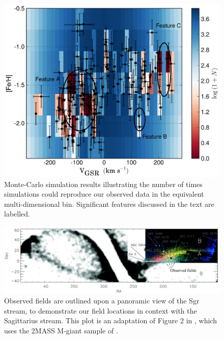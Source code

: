 \documentclass[preprint2]{aastex}
\begin{document}
	\begin{figure}[h!]
		\includegraphics[width=\columnwidth]{./figures/montecarlo.eps}
		\caption{Monte-Carlo simulation results illustrating the number of times simulations could reproduce our observed data in the equivalent multi-dimensional bin. Significant features discussed in the text are labelled.}
		\label{fig:monte-carlo}
	\end{figure}

	\begin{figure}[t!]
		\includegraphics[width=\textwidth]{./figures/belokurov2006.eps}
		\caption{Observed fields are outlined upon a panoramic view of the Sgr stream, to demonstrate our field locations in context with the Sagittarius stream. This plot is an adaptation of Figure 2 in \citet{Belokurov;et-al_2006}, which uses the 2MASS M-giant sample of \citet{Majewski;et-al_2003}.}
		\label{fig:sgr-field-of-streams}
	\end{figure}
	
\end{document}
